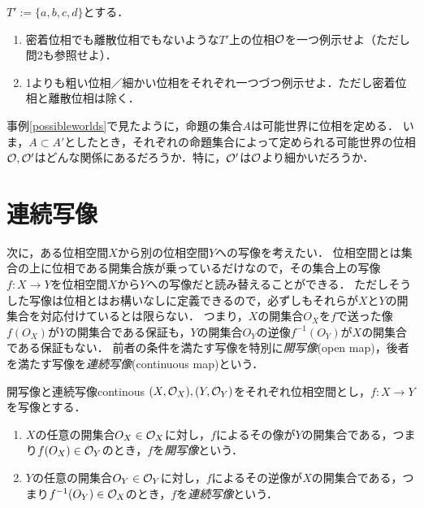 \documentclass[11pt,a4paper, dvipdfmx]{jsarticle}
\begin{document}
\begin{exercise}
$T':=\{a, b, c, d\}$とする．
\begin{enumerate}
 \item 密着位相でも離散位相でもないような$T'$上の位相$\mathcal{O}$を一つ例示せよ（ただし問2も参照せよ）．
 \item 1よりも粗い位相／細かい位相をそれぞれ一つづつ例示せよ．ただし密着位相と離散位相は除く．
\end{enumerate}
\end{exercise}


\begin{develop}
事例\ref{possibleworlds}で見たように，命題の集合$A$は可能世界に位相を定める．
いま，$A \subset A'$としたとき，それぞれの命題集合によって定められる可能世界の位相$\mathcal{O}, \mathcal{O}'$はどんな関係にあるだろうか．特に，$\mathcal{O}'$は$\mathcal{O}$より細かいだろうか．
\end{develop}






\section{連続写像}
次に，ある位相空間$X$から別の位相空間$Y$への写像を考えたい．
位相空間とは集合の上に位相である開集合族が乗っているだけなので，その集合上の写像$f:X \to Y$を位相空間$X$から$Y$への写像だと読み替えることができる．
ただしそうした写像は位相とはお構いなしに定義できるので，必ずしもそれらが$X$と$Y$の開集合を対応付けているとは限らない．
つまり，$X$の開集合$O_X$を$f$で送った像$f(O_X)$が$Y$の開集合である保証も，$Y$の開集合$O_Y$の逆像$f^{-1}(O_Y)$が$X$の開集合である保証もない．
前者の条件を満たす写像を特別に\emph{開写像}(open map)，後者を満たす写像を\emph{連続写像}(continuous map)という．

\begin{dfn}{開写像と連続写像}{continous}
  $(X, \mathcal{O}_X), (Y, \mathcal{O}_Y)$をそれぞれ位相空間とし，$f:X \to Y$を写像とする．
  \begin{enumerate}
    \item $X$の任意の開集合$O_X \in \mathcal{O}_X$に対し，$f$によるその像が$Y$の開集合である，つまり$f(O_X) \in \mathcal{O}_Y$のとき，$f$を\emph{開写像}という．
    \item $Y$の任意の開集合$O_Y \in \mathcal{O}_Y$に対し，$f$によるその逆像が$X$の開集合である，つまり$f^{-1}(O_Y) \in \mathcal{O}_X$のとき，$f$を\emph{連続写像}という．
  \end{enumerate}  
\end{dfn}
  
\end{document}
